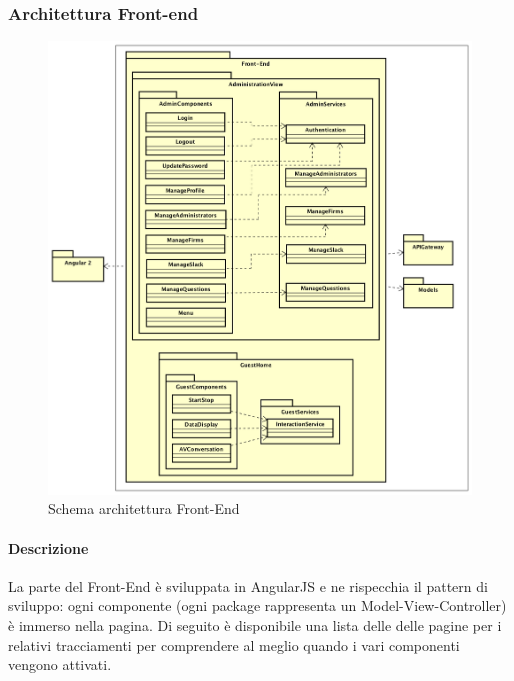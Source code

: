 \documentclass[../DefinizioneDiProdotto.tex]{subfiles}
\begin{document}
		\newpage
		\subsubsection{Architettura Front-end}
		\begin{figure}[h]
			\centering
			\includegraphics[width=\textwidth]{Architettura/Front-end.png}
			\caption{Schema architettura Front-End}
		\end{figure}

		\paragraph{Descrizione}	La parte del Front-End è sviluppata in AngularJS e ne rispecchia il pattern di sviluppo: ogni componente (ogni package rappresenta un Model-View-Controller) è immerso nella pagina. Di seguito è disponibile una lista delle  delle pagine per i relativi tracciamenti per comprendere al meglio quando i vari componenti vengono attivati. \\ \\
\end{document}
